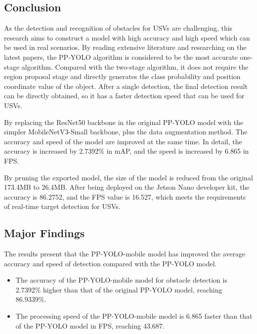 \documentclass[sensors,article,submit,moreauthors,pdftex]{Definitions/mdpi}
\begin{document}
\begin{paracol}{2}
\section{Conclusion}


As the detection and recognition of obstacles for USVs are challenging, this research aims to construct a model with high accuracy and high speed which can be used in real scenarios. By reading extensive literature and researching on the latest papers, the PP-YOLO algorithm is considered to be the most accurate one-stage algorithm. Compared with the two-stage algorithm, it does not require the region proposal stage and directly generates the class probability and position coordinate value of the object. After a single detection, the final detection result can be directly obtained, so it has a faster detection speed that can be used for USVs.

By replacing the ResNet50 backbone in the original PP-YOLO model with the simpler MobileNetV3-Small backbone, plus the data augmentation method. The accuracy and speed of the model are improved at the same time. In detail, the accuracy is increased by 2.7392\% in mAP, and the speed is increased by 6.865 in FPS.

By pruning the exported model, the size of the model is reduced from the original 173.4MB to 26.4MB. After being deployed on the Jetson Nano developer kit, the accuracy is 86.2752, and the FPS value is 16.527, which meets the requirements of real-time target detection for USVs.

\subsection{Major Findings}
The results present that the PP-YOLO-mobile model has improved the average accuracy and speed of detection compared with the PP-YOLO model.

\begin{itemize}
\item{The accuracy of the PP-YOLO-mobile model for obstacle detection is 2.7392\% higher than that of the original PP-YOLO model, reaching 86.9339\%.}
\end{itemize}

\begin{itemize}
\item{The processing speed of the PP-YOLO-mobile model is 6.865 faster than that of the PP-YOLO model in FPS, reaching 43.687.}

\end{itemize}


\end{paracol}
\end{document}
